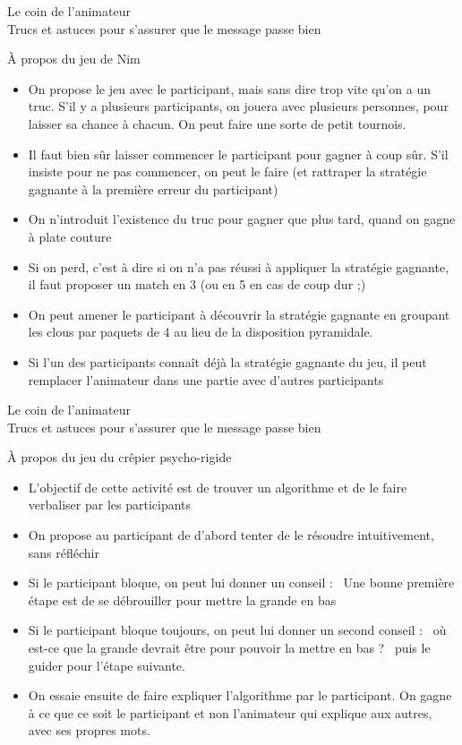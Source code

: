 \begin{frame}{Le coin de l'animateur\\[-5pt]
\label{coin::animateur}
  {\large Trucs et astuces pour s'assurer que le message passe bien}}
\begin{block}{À propos du jeu de Nim}
\begin{itemize}
    \item On propose le jeu avec le participant, mais sans dire trop vite qu'on
      a un truc. S'il y a plusieurs participants, on jouera avec plusieurs
      personnes, pour laisser sa chance à chacun. On peut faire une sorte de
      petit tournois.
    \item Il faut bien sûr laisser commencer le participant pour gagner à coup
      sûr. S'il insiste pour ne pas commencer, on peut le faire (et rattraper
      la stratégie gagnante à la première erreur du participant)
    \item On n'introduit l'existence du truc pour gagner que plus tard, quand
      on gagne à plate couture
    \item Si on perd, c'est à dire si on n'a pas réussi à appliquer la
      stratégie gagnante, il faut proposer un match en 3 (ou en 5 en cas de
      coup dur ;)
    \item On peut amener le participant à découvrir la stratégie gagnante en
      groupant les clous par paquets de 4 au lieu de la disposition pyramidale.
    \item Si l'un des participants connaît déjà la stratégie gagnante du jeu,
      il peut remplacer l'animateur dans une partie avec d'autres participants
    \end{itemize}
  \end{block}
\end{frame}

\begin{frame}{Le coin de l'animateur\\[-5pt]
  {\large Trucs et astuces pour s'assurer que le message passe bien}}
  \begin{block}{À propos du jeu du crêpier psycho-rigide}
    \begin{itemize}
    \item L'objectif de cette activité est de trouver un algorithme et de
    le faire verbaliser par les participants
    \item On propose au participant de d'abord tenter de le résoudre
    intuitivement, sans réfléchir
    \item Si le participant bloque, on peut lui donner un conseil : \og~Une
    bonne première étape est de se débrouiller pour mettre la grande en bas~\fg
    \item Si le participant bloque toujours, on peut lui donner un second
    conseil : \og~où est-ce que la grande devrait être pour pouvoir la mettre en
    bas ? ~\fg puis le guider pour l'étape suivante.
    \item On essaie ensuite de faire expliquer l'algorithme par le participant.
    On gagne à ce que ce soit le participant et non l'animateur qui explique aux
    autres, avec ses propres mots.
    \end{itemize}
  \end{block}
\end{frame}

